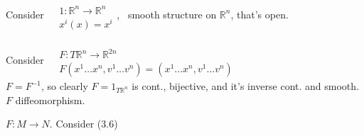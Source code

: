%                                               
%                                                              
%
% 
%




Consider $ \begin{aligned} & \quad \\ 
  & 1 : \mathbb{R}^n \to \mathbb{R}^n \\ & x^i(x) = x^i \end{aligned}$, \quad \, smooth structure on $\mathbb{R}^n$, that's open.  

Consider $\begin{aligned} & \quad \\ 
  & F: T\mathbb{R}^n \to \mathbb{R}^{2n} \\
& F(x^1 \dots x^n, v^1 \dots v^n ) = (x^1 \dots x^n, v^1 \dots v^n) \end{aligned}$ \\
$F= F^{-1}$, so clearly $F = 1_{T\mathbb{R}^n} $ is cont., bijective, and it's inverse cont. and smooth.  $F$ diffeomorphism.  

  $F:M \to N$.  Consider (3.6)

